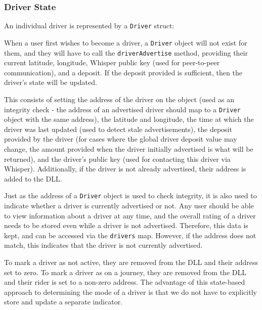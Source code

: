 

\subsubsection{Driver State}

An individual driver is represented by a \lstinline{Driver} struct:



When a user first wishes to become a driver, a \lstinline{Driver} object will not exist for them\footnotemark, and they will have to call the \lstinline{driverAdvertise} method, providing their current latitude, longitude, Whisper public key (used for peer-to-peer communication), and a deposit. If the deposit provided is sufficient, then the driver's state will be updated.


This consists of setting the address of the driver on the object (used as an integrity check - the address of an advertised driver should map to a \lstinline{Driver} object with the same address), the latitude and longitude, the time at which the driver was last updated (used to detect stale advertisements), the deposit provided by the driver (for cases where the global driver deposit value may change, the amount provided when the driver initially advertised is what will be returned), and the driver's public key (used for contacting this driver via Whisper). Additionally, if the driver is not already advertised, their address is added to the DLL.

Just as the address of a \lstinline{Driver} object is used to check integrity, it is also used to indicate whether a driver is currently advertised or not. Any user should be able to view information about a driver at any time, and the overall rating of a driver needs to be stored even while a driver is not advertised. Therefore, this data is kept, and can be accessed via the \lstinline{drivers} map. However, if the address does not match, this indicates that the driver is not currently advertised.

To mark a driver as not active, they are removed from the DLL and their address set to zero. To mark a driver as on a journey, they are removed from the DLL and their rider is set to a non-zero address. The advantage of this state-based approach to determining the mode of a driver is that we do not have to explicitly store and update a separate indicator.

